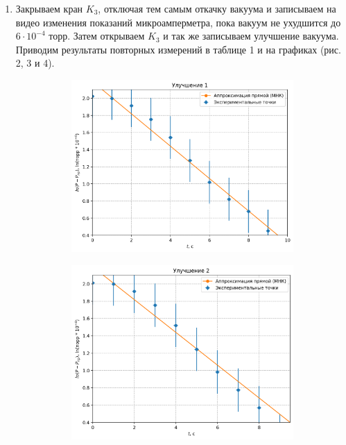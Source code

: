 \documentclass[a4paper,12pt]{article} %
\begin{document}
\begin{enumerate}
    \item Закрываем кран $K_3$, отключая тем самым откачку вакуума и записываем на видео изменения показаний микроамперметра, пока вакуум не ухудшится до $6\cdot10^{-4}$ торр. Затем открываем $K_3$ и так же записываем улучшение вакуума. Приводим результаты повторных измерений в таблице 1 и на графиках (рис. 2, 3 и 4).

    \begin{figure}[H]
        \centering
        \begin{subfigure}[b]{0.4\textwidth}
          \includegraphics[width=\textwidth]{graphdown1.png}
        \end{subfigure}
        \hfill
        \begin{subfigure}[b]{0.4\textwidth}
          \includegraphics[width=\textwidth]{graphdown2.png}

\end{subfigure}
\end{figure}
\end{enumerate}
\end{document}

